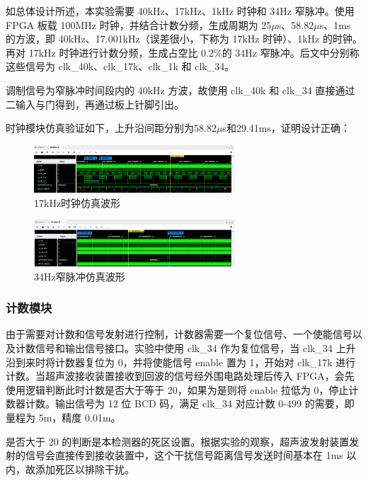 \documentclass[a4paper, twocolumn]{ctexart}
\begin{document}
如总体设计所述，本实验需要 40kHz、17kHz、1kHz 时钟和 34Hz 窄脉冲。使用 FPGA 板载 100MHz 时钟，并结合计数分频，生成周期为 25$\mu$s、58.82$\mu$s、1ms 的方波，即 40kHz、17.001kHz（误差很小，下称为 17kHz 时钟）、1kHz 的时钟。再对 17kHz 时钟进行计数分频，生成占空比 0.2\%的 34Hz 窄脉冲。后文中分别称这些信号为 clk\_40k、clk\_17k、clk\_1k 和 clk\_34。

调制信号为窄脉冲时间段内的 40kHz 方波，故使用 clk\_40k 和 clk\_34 直接通过二输入与门得到，再通过板上针脚引出。

时钟模块仿真验证如下，上升沿间距分别为58.82$\mu$s和29.41ms，证明设计正确：

\begin{figure}[ht]
    \centering
    \includegraphics[width=7.5cm]{../assets/clock_17k.png}
    \caption{17kHz时钟仿真波形}
    \label{fig:sim_clk_17k}
\end{figure}

\begin{figure}[ht]
    \centering
    \includegraphics[width=7.5cm]{../assets/clock_34.png}
    \caption{34Hz窄脉冲仿真波形}
    \label{fig:sim_clk_34}
\end{figure}

\subsubsection{计数模块}

由于需要对计数和信号发射进行控制，计数器需要一个复位信号、一个使能信号以及计数信号和输出信号接口。实验中使用 clk\_34 作为复位信号，当 clk\_34 上升沿到来时将计数器复位为 0，并将使能信号 enable 置为 1，开始对 clk\_17k 进行计数。当超声波接收装置接收到回波的信号经外围电路处理后传入 FPGA，会先使用逻辑判断此时计数是否大于等于 20，如果为是则将 enable 拉低为 0，停止计数器计数。输出信号为 12 位 BCD 码，满足 clk\_34 对应计数 0-499 的需要，即量程为 5m，精度 0.01m。

是否大于 20 的判断是本检测器的死区设置。根据实验的观察，超声波发射装置发射的信号会直接传到接收装置中，这个干扰信号距离信号发送时间基本在 1ms 以内，故添加死区以排除干扰。
\end{document}
